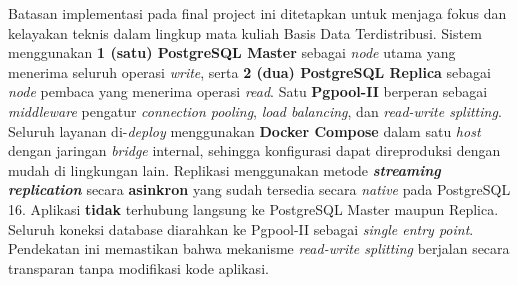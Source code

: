 Batasan implementasi pada final project ini ditetapkan untuk menjaga
fokus dan kelayakan teknis dalam lingkup mata kuliah Basis Data
Terdistribusi. Sistem menggunakan \textbf{1 (satu) PostgreSQL Master}
sebagai \textit{node} utama yang menerima seluruh operasi
\textit{write}, serta \textbf{2 (dua) PostgreSQL Replica} sebagai
\textit{node} pembaca yang menerima operasi \textit{read}. Satu
\textbf{Pgpool-II} berperan sebagai \textit{middleware} pengatur
\textit{connection pooling}, \textit{load balancing}, dan
\textit{read-write splitting}. Seluruh layanan di-\textit{deploy}
menggunakan \textbf{Docker Compose} dalam satu \textit{host} dengan
jaringan \textit{bridge} internal, sehingga konfigurasi dapat
direproduksi dengan mudah di lingkungan lain. Replikasi menggunakan
metode \textbf{\textit{streaming replication}} secara
\textbf{asinkron} yang sudah tersedia secara \textit{native} pada
PostgreSQL 16. Aplikasi \textbf{tidak} terhubung langsung ke
PostgreSQL Master maupun Replica. Seluruh koneksi database
diarahkan ke Pgpool-II sebagai \textit{single entry point}.
Pendekatan ini memastikan bahwa mekanisme \textit{read-write
splitting} berjalan secara transparan tanpa modifikasi kode aplikasi.
